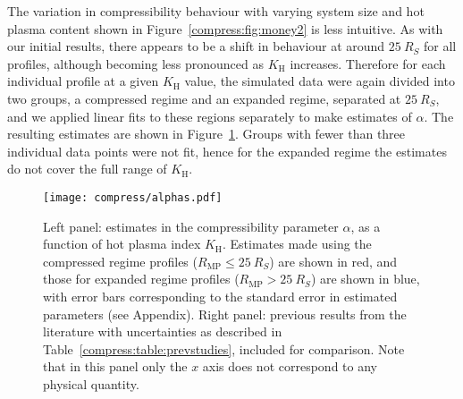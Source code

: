The variation in compressibility behaviour with varying system size and hot plasma content shown in Figure~\ref{compress:fig:money2} is less intuitive. As with our initial results, there appears to be a shift in behaviour at around $\SI{25}{R_S}$ for all profiles, although becoming less pronounced as $K_\mathrm{H}$ increases. Therefore for each individual profile at a given $K_\mathrm{H}$ value, the simulated data were again divided into two groups, a compressed regime and an expanded regime, separated at $\SI{25}{R_S}$, and we applied linear fits to these regions separately to make estimates of $\alpha$. The resulting estimates are shown in Figure~\ref{compress:fig:alphas}. Groups with fewer than three individual data points were not fit, hence for the expanded regime the estimates do not cover the full range of $K_\mathrm{H}$.
\begin{figure}
\centering
\noindent\texttt{[image: compress/alphas.pdf]}
\caption[Estimates of magnetospheric compressibility parameter $\alpha$, for different system sizes and $K_\mathrm{H}$ values.]{Left panel: estimates in the compressibility parameter $\alpha$, as a function of hot plasma index $K_\mathrm{H}$. Estimates made using the compressed regime profiles ($R_\mathrm{MP} \leq \SI{25}{R_S}$) are shown in red, and those for expanded regime profiles ($R_\mathrm{MP} > \SI{25}{R_S}$) are shown in blue, with error bars corresponding to the standard error in estimated parameters (see Appendix). Right panel: previous results from the literature with uncertainties as described in Table~\ref{compress:table:prevstudies}, included for comparison. Note that in this panel only the $x$ axis does not correspond to any physical quantity.}
\label{compress:fig:alphas}
\end{figure}

